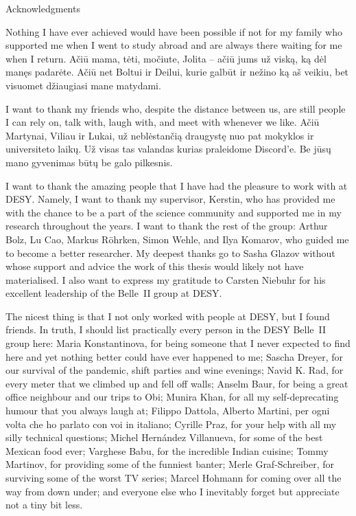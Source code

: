 \begin{abstractpage}{Acknowledgments}
    Nothing I have ever achieved would have been possible if not for my family who supported me
    when I went to study abroad and are always there waiting for me when I return.
    Ačiū mama, tėti, močiute, Jolita -- ačiū jums už viską, ką dėl manęs padarėte.
    Ačiū net Boltui ir Deilui, kurie galbūt ir nežino ką aš veikiu, bet visuomet džiaugiasi mane matydami.

    I want to thank my friends who, despite the distance between us, are still people I can rely on, talk with,
    laugh with, and meet with whenever we like.
    Ačiū Martynai, Viliau ir Lukai, už neblėstančią draugystę nuo pat mokyklos ir universiteto laikų.
    Už visas tas valandas kurias praleidome Discord'e.
    Be jūsų mano gyvenimas būtų be galo pilkesnis.

    I want to thank the amazing people that I have had the pleasure to work with at DESY.
    Namely, I want to thank my supervisor, Kerstin, who has provided me with the chance to be a part of the science community
    and supported me in my research throughout the years.
    I want to thank the rest of the group: Arthur Bolz, Lu Cao, Markus R\"ohrken, Simon Wehle, and Ilya Komarov, who guided me to become a better researcher.
    My deepest thanks go to Sasha Glazov without whose support and advice the work of this thesis would likely not have materialised.
    I also want to express my gratitude to Carsten Niebuhr for his excellent leadership of the Belle~II group at DESY.

    The nicest thing is that I not only worked with people at DESY, but I found friends.
    In truth, I should list practically every person in the DESY Belle~II group here:
    Maria Konstantinova, for being someone that I never expected to find here and yet nothing better could have ever happened to me;
    Sascha Dreyer, for our survival of the pandemic, shift parties and wine evenings;
    Navid K. Rad, for every meter that we climbed up and fell off walls;
    Anselm Baur, for being a great office neighbour and our trips to Obi;
    Munira Khan, for all my self-deprecating humour that you always laugh at;
    Filippo Dattola, Alberto Martini, per ogni volta che ho parlato con voi in italiano;
    Cyrille Praz, for your help with all my silly technical questions;
    Michel Hern\'andez Villanueva, for some of the best Mexican food ever;
    Varghese Babu, for the incredible Indian cuisine;
    Tommy Martinov, for providing some of the funniest banter;
    Merle Graf-Schreiber, for surviving some of the worst TV series;
    Marcel Hohmann for coming over all the way from down under;
    and everyone else who I inevitably forget but appreciate not a tiny bit less.
    

\end{abstractpage}
